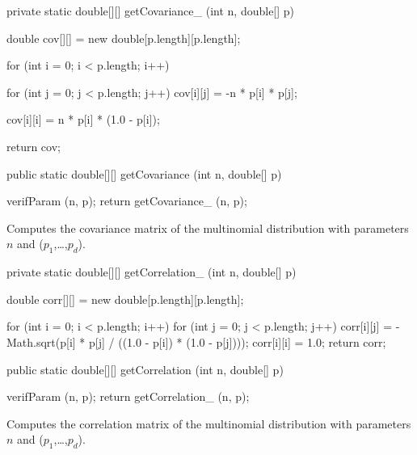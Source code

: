 \begin{code}\begin{hide}

   private static double[][] getCovariance_ (int n, double[] p) {
      double cov[][] = new double[p.length][p.length];

      for (int i = 0; i < p.length; i++)
      {
         for (int j = 0; j < p.length; j++)
            cov[i][j] = -n * p[i] * p[j];

         cov[i][i] = n * p[i] * (1.0 - p[i]);
      }
      return cov;
   }\end{hide}

   public static double[][] getCovariance (int n, double[] p)\begin{hide} {
      verifParam (n, p);
      return getCovariance_ (n, p);
   }\end{hide}
\end{code}
\begin{tabb}
   Computes the covariance matrix of the multinomial distribution
   with parameters $n$ and ($p_1$,\ldots,$p_d$).
\end{tabb}
\begin{code}\begin{hide}

   private static double[][] getCorrelation_ (int n, double[] p) {
      double corr[][] = new double[p.length][p.length];

      for (int i = 0; i < p.length; i++) {
         for (int j = 0; j < p.length; j++)
            corr[i][j] = -Math.sqrt(p[i] * p[j] / ((1.0 - p[i]) * (1.0 - p[j])));
         corr[i][i] = 1.0;
      }
      return corr;
   }\end{hide}

   public static double[][] getCorrelation (int n, double[] p)\begin{hide} {
      verifParam (n, p);
      return getCorrelation_ (n, p);
   }\end{hide}
\end{code}
\begin{tabb}
   Computes the correlation matrix of the multinomial distribution
   with parameters $n$ and ($p_1$,\ldots,$p_d$).
\end{tabb}
